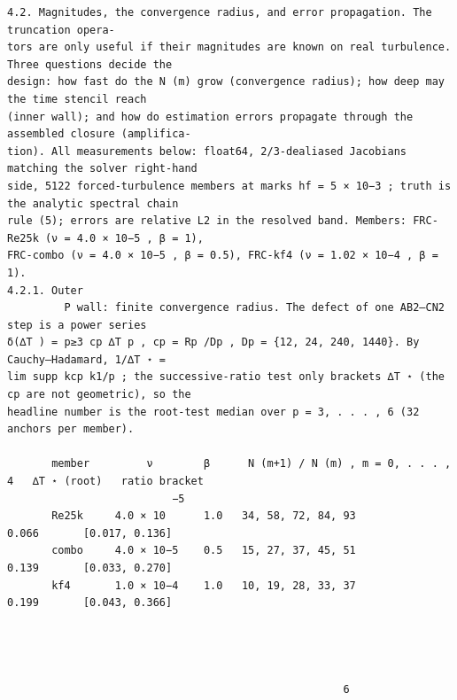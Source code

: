 \documentclass[letterpaper]{article}
\begin{document}
\begin{Verbatim}[fontsize=\fontsize{6.35}{7.15}\selectfont,breaklines=false]
4.2. Magnitudes, the convergence radius, and error propagation. The truncation opera-
tors are only useful if their magnitudes are known on real turbulence. Three questions decide the
design: how fast do the N (m) grow (convergence radius); how deep may the time stencil reach
(inner wall); and how do estimation errors propagate through the assembled closure (amplifica-
tion). All measurements below: float64, 2/3-dealiased Jacobians matching the solver right-hand
side, 5122 forced-turbulence members at marks hf = 5 × 10−3 ; truth is the analytic spectral chain
rule (5); errors are relative L2 in the resolved band. Members: FRC-Re25k (ν = 4.0 × 10−5 , β = 1),
FRC-combo (ν = 4.0 × 10−5 , β = 0.5), FRC-kf4 (ν = 1.02 × 10−4 , β = 1).
4.2.1. Outer
         P wall: finite convergence radius. The defect of one AB2–CN2 step is a power series
δ(∆T ) = p≥3 cp ∆T p , cp = Rp /Dp , Dp = {12, 24, 240, 1440}. By Cauchy–Hadamard, 1/∆T ⋆ =
lim supp kcp k1/p ; the successive-ratio test only brackets ∆T ⋆ (the cp are not geometric), so the
headline number is the root-test median over p = 3, . . . , 6 (32 anchors per member).

       member         ν        β      N (m+1) / N (m) , m = 0, . . . , 4   ∆T ⋆ (root)   ratio bracket
                          −5
       Re25k     4.0 × 10      1.0   34, 58, 72, 84, 93                      0.066       [0.017, 0.136]
       combo     4.0 × 10−5    0.5   15, 27, 37, 45, 51                      0.139       [0.033, 0.270]
       kf4       1.0 × 10−4    1.0   10, 19, 28, 33, 37                      0.199       [0.043, 0.366]




                                                     6
\end{Verbatim}
\newpage
\end{document}
